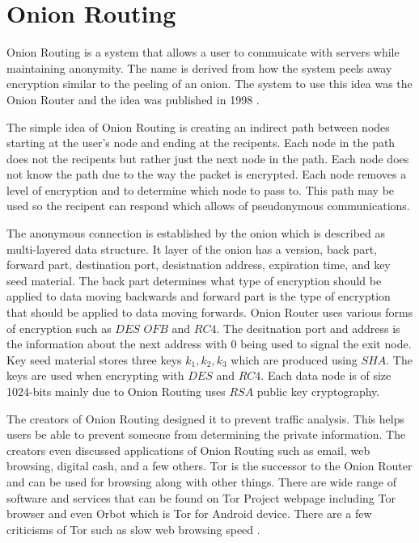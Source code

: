 \documentclass[12pt]{article}
\begin{document}
\section{Onion Routing}\label{}
Onion Routing is a system that allows a user to commuicate with servers while maintaining anonymity. The name is derived from how the system peels away encryption similar to the peeling of an onion. The system to use this idea was the Onion Router and the idea was published in 1998 \cite{Reed}. 

The simple idea of Onion Routing is creating an indirect path between nodes starting at the user's node and ending at the recipents. Each node in the path does not the recipents but rather just the next node in the path. Each node does not know the path due to the way the packet is encrypted. Each node removes a level of encryption and to determine which node to pass to. This path may be used so the recipent can respond which allows of pseudonymous communications.

The anonymous connection is established by the onion which is described as multi-layered data structure. It layer of the onion has a version, back part, forward part, destination port, desistnation address, expiration time, and key seed material. The back part determines what type of encryption should be applied to data moving backwards and forward part is the type of encryption that should be applied to data moving forwards.  Onion Router uses various forms of encryption such as $DES$ $OFB$ and $RC4$\cite{Reed}. The desitnation port and address is the information about the next address with 0 being used to signal the exit node. Key seed material stores three keys $k_1, k_2, k_3$ which are produced using $SHA$. The keys are used when encrypting with $DES$ and $RC4$. Each data node is of size 1024-bits mainly due to Onion Routing uses $RSA$ public key cryptography.

The creators of Onion Routing designed it to prevent traffic analysis. This helps users be able to prevent someone from determining the private information. The creators even discussed applications of Onion Routing such as email, web browsing, digital cash, and a few others\cite{Reed}. Tor is the successor to the Onion Router and can be used for browsing along with other things. There are wide range of software and services that can be found on Tor Project webpage including Tor browser and even Orbot which is Tor for Android device. There are a few criticisms of Tor such as slow web browsing speed \cite{GoldbertTwo}.
\end{document}
